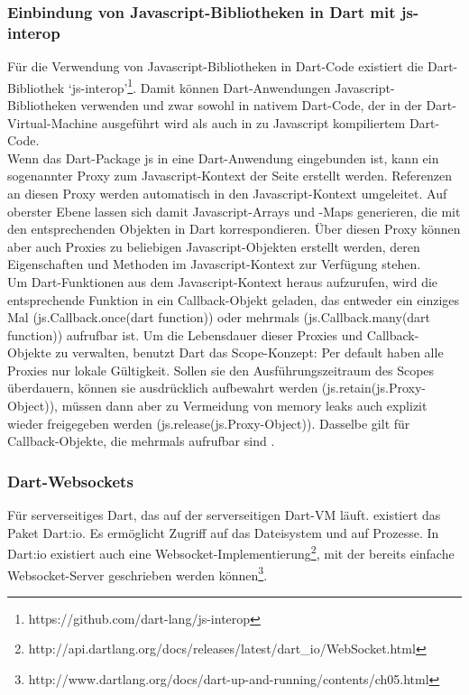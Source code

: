 \subsubsection{Einbindung von Javascript-Bibliotheken in Dart mit js-interop}\label{js-interop}
Für die Verwendung von Javascript-Bibliotheken in Dart-Code existiert die Dart-Bibliothek ‘js-interop’\footnote{https://github.com/dart-lang/js-interop}. Damit können Dart-Anwendungen Javascript-Bibliotheken verwenden und zwar sowohl in nativem Dart-Code, der in der Dart-Virtual-Machine ausgeführt wird als auch in zu Javascript kompiliertem Dart-Code.\\
Wenn das Dart-Package js in eine Dart-Anwendung eingebunden ist, kann ein sogenannter Proxy zum Javascript-Kontext der Seite erstellt werden. Referenzen an diesen Proxy werden automatisch in den Javascript-Kontext umgeleitet. Auf oberster Ebene lassen sich damit Javascript-Arrays und -Maps generieren, die mit den entsprechenden Objekten in Dart korrespondieren. Über diesen Proxy können aber auch Proxies zu beliebigen Javascript-Objekten erstellt werden, deren Eigenschaften und Methoden im Javascript-Kontext zur Verfügung stehen.\\
Um Dart-Funktionen aus dem Javascript-Kontext heraus aufzurufen, wird die entsprechende Funktion in ein Callback-Objekt geladen, das entweder ein einziges Mal (js.Callback.once(dart function)) oder mehrmals (js.Callback.many(dart function)) aufrufbar ist. Um die Lebensdauer dieser Proxies und Callback-Objekte zu verwalten, benutzt Dart das Scope-Konzept: Per default haben alle Proxies nur lokale Gültigkeit. Sollen sie den Ausführungszeitraum des Scopes überdauern, können sie ausdrücklich aufbewahrt werden (js.retain(js.Proxy-Object)), müssen dann aber zu Vermeidung von memory leaks auch explizit wieder freigegeben werden (js.release(js.Proxy-Object)). Dasselbe gilt für Callback-Objekte, die mehrmals aufrufbar sind \cite{js-interop}.

\subsubsection{Dart-Websockets}
Für serverseitiges Dart, das auf der serverseitigen Dart-VM läuft. existiert das Paket Dart:io. Es ermöglicht Zugriff auf das Dateisystem und auf Prozesse. In Dart:io existiert auch eine Websocket-Implementierung\footnote{http://api.dartlang.org/docs/releases/latest/dart\_io/WebSocket.html}, mit der bereits einfache Websocket-Server geschrieben werden können\footnote{http://www.dartlang.org/docs/dart-up-and-running/contents/ch05.html}.
